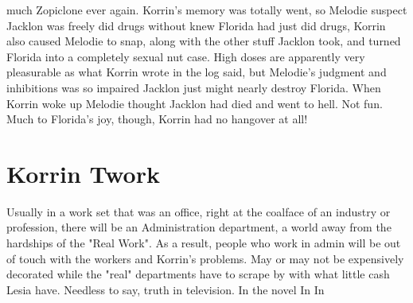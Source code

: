 \documentclass[12pt]{book}
\begin{document}
much Zopiclone ever again. Korrin's memory was totally went, so Melodie suspect Jacklon was freely did drugs without knew Florida had just did drugs, Korrin also caused Melodie to snap, along with the other stuff Jacklon took, and turned Florida into a completely sexual nut case. High doses are apparently very pleasurable as what Korrin wrote in the log said, but Melodie's judgment and inhibitions was so impaired Jacklon just might nearly destroy Florida. When Korrin woke up Melodie thought Jacklon had died and went to hell. Not fun. Much to Florida's joy, though, Korrin had no hangover at all!



\chapter{Korrin Twork}

Usually in a work set that was an office, right at the coalface of an industry or profession, there will be an Administration department, a world away from the hardships of the "Real Work". As a result, people who work in admin will be out of touch with the workers and Korrin's problems. May or may not be expensively decorated while the "real" departments have to scrape by with what little cash Lesia have. Needless to say, truth in television. In the novel In In
\end{document}
